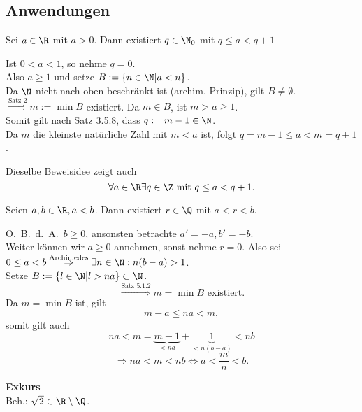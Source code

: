 \documentclass[../ana1.tex]{subfiles}
\begin{document}
\subsection{Anwendungen}
\begin{lem}
	Sei \( a\in\R \) mit \( a > 0 \). Dann existiert \(q\in\N_0\) mit \(q\leq a<q+1\)
\end{lem}
\begin{bew}
	Ist \( 0 < a < 1 \), so nehme \( q = 0 \).\\
	Also \(a\geq 1\) und setze \(B := \{ n\in\N | a < n \} \).\\
	Da \( \N \) nicht nach oben beschränkt ist (archim. Prinzip), gilt \(B\neq \emptyset \).\\
	\(\overset{\text{Satz 2}}{\Rightarrow} m:=\min B\) existiert. Da \(m\in B\), ist \(m> a \geq 1\).\\
	Somit gilt nach Satz 3.5.8, dass \(q:= m-1\in\N \).\\
	Da \( m \) die kleinste natürliche Zahl mit \(m<a\) ist, folgt \(q = m-1 \leq a < m = q+1\).
\end{bew}
\begin{bem}
	Dieselbe Beweisidee zeigt auch 
	\[ \forall a\in\R\exists q\in\Z \text{ mit } q\leq a<q+1.\]
\end{bem}
\begin{satz}
	Seien \( a,b\in\R, a<b \). Dann existiert \( r\in\Q \) mit \(a<r<b\).
\end{satz}
\begin{bew}
	O.\ B.\ d.\ A.\  \(b\geq 0\), ansonsten betrachte \( a' = -a, b' = -b \).\\
	Weiter können wir \(a\geq 0\) annehmen, sonst nehme \(r=0\).
	Also sei \(0\leq a <b \overset{\text{Archimedes}}{\Rightarrow} \exists n\in\N: n(b-a)>1\).\\
	Setze \( B := \{ l\in\N | l > na \} \subset \N \).
	\[ \overset{\text{Satz 5.1.2}}{\Rightarrow} m = \min B \text{ existiert}.\]
	Da \(m=\min B\) ist, gilt 
	\[m -a\leq na<m,\] 
	somit gilt auch 
	\[ na<m=\underbrace{m-1}_{<na}+\underbrace{1}_{<n(b-a)}<nb \]
	\[ \Rightarrow na<m<nb \Leftrightarrow a<\frac{m}{n}<b.\]
\end{bew}
\textbf{Exkurs}\\
Beh.: \( \sqrt{2}\in\R\setminus \Q \).
\end{document}
